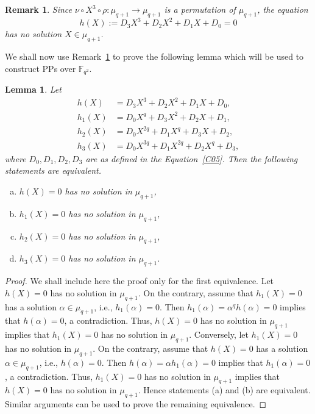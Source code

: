 \documentclass[12pt]{amsart}
\newtheorem{lem}[thm]{Lemma}
\newtheorem{rmk}[thm]{Remark}
\numberwithin{equation}{section}
\theoremstyle{definition}
\newcommand{\F}{\mathbb F}
\begin{document}
 \begin{rmk}\label{R05}
  Since $ {\nu} \circ X^3 \circ \rho: \mu_{q+1} \rightarrow \mu_{q+1}$ is a permutation of $\mu_{q+1}$, the equation $$h(X):= D_3X^3+D_2X^2+D_1X+D_0 = 0$$
  has no solution $X \in \mu_{q+1}$.
 \end{rmk}

 We shall now use Remark~\ref{R05} to prove the following lemma which will be used to construct PPs over $\F_{q^2}$.

\begin{lem} \label{L05}
 Let
\begin{equation*}
 \begin{split}
  h(X)&=D_3X^3 +D_2X^2+D_1X+D_0,\\
  h_1(X) &= D_0X^q+D_3X^2 +D_2X+D_1,\\
  h_2(X) &=D_0X^{2q}+D_1X^q+D_3X+D_2,\\
  h_3(X) &=D_0X^{3q}+D_1X^{2q}+D_2X^q+D_3,
 \end{split}
\end{equation*}
where $D_0,D_1, D_2, D_3$ are as defined in the Equation~\eqref{C05}. Then the following statements are equivalent.
\begin{enumerate}[(a)]
 \item $h(X)=0$ has no solution in $\mu_{q+1}$,  \item $h_1(X)=0$ has no solution in $\mu_{q+1}$,  \item $h_2(X)=0$ has no solution in $\mu_{q+1}$,  \item $h_3(X)=0$ has no solution in $\mu_{q+1}$.
\end{enumerate}
\end{lem}
\begin{proof} We shall include here the proof only for the first equivalence. Let $h(X)=0$ has no solution in $\mu_{q+1}$. On the contrary, assume that $h_1(X)=0$ has a solution $\alpha \in \mu_{q+1}$, i.e., $h_1(\alpha)=0$. Then $h_1(\alpha)=\alpha^qh(\alpha)=0$ implies that $h(\alpha)=0$, a contradiction. Thus, $h(X)=0$ has no solution in $\mu_{q+1}$ implies that  $h_1(X)=0$ has no solution in $\mu_{q+1}$. Conversely, let $h_1(X)=0$ has no solution in $\mu_{q+1}$. On the contrary, assume that $h(X)=0$ has a solution $\alpha \in \mu_{q+1}$, i.e., $h(\alpha)=0$. Then $h(\alpha)=\alpha h_1(\alpha)=0$ implies that $h_1(\alpha)=0$, a contradiction. Thus, $h_1(X)=0$ has no solution in $\mu_{q+1}$  implies that  $h(X)=0$ has no solution in $\mu_{q+1}$. Hence statements (a) and (b) are equivalent. Similar arguments can be used to prove the remaining equivalence.
\end{proof}
\end{document}
